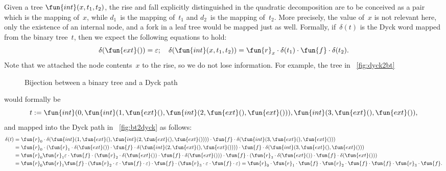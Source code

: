 Given a tree \(\fun{int}(x,t_1,t_2)\), the rise and fall explicitly
distinguished in the quadratic decomposition are to be conceived as a
pair which is the mapping of~\(x\), while \(d_1\)~is the mapping
of~\(t_1\) and \(d_2\)~is the mapping of~\(t_2\). More precisely, the
value of~\(x\) is not relevant here, only the existence of an internal
node, and a fork in a leaf tree would be mapped just as well. Formally,
if~\(\delta(t)\) is the Dyck word mapped from the binary tree~\(t\),
then we expect the following equations to hold:
\begin{equation}
\delta(\fun{ext}()) = \varepsilon; \quad \delta(\fun{int}(x,t_1,t_2))
= \fun{r}_{x} \cdot \delta(t_1) \cdot \fun{f} \cdot \delta(t_2).
\label{eq:delta}
\end{equation}
Note that we attached the node contents~\(x\) to the rise, so we do
not lose information. For example, the tree in \fig~\vref{fig:dyck2bt}
\begin{figure}
\centering
{}
\qquad\quad
\subfloat[Dyck path corresponding to preorder encoding $[0,1,\Box,2,\Box,\Box,3,\Box,\Box\char93$\label{fig:bt2dyck}]{%
\texttt{[image: bt2dyck]}}
\caption{Bijection between a binary tree and a Dyck path}
\end{figure}
would formally be
\begin{equation*}
  t := \fun{int}(0, \fun{int}(1, \fun{ext}(),
\fun{int}(2, \fun{ext}(), \fun{ext}())), \fun{int}(3, \fun{ext}(),
\fun{ext}()),
\end{equation*}
and mapped into the Dyck path in
\fig~\ref{fig:bt2dyck} as
follows:
\begin{align*}
\delta(t)
&= \fun{r}_0 \cdot \delta(\fun{int}(1, \fun{ext}(),
\fun{int}(2, \fun{ext}(), \fun{ext}()))) \cdot \fun{f} \cdot
\delta(\fun{int}(3, \fun{ext}(), \fun{ext}()))\\ &= \fun{r}_0
\cdot (\fun{r}_1 \cdot \delta(\fun{ext}()) \cdot \fun{f} \cdot
\delta(\fun{int}(2, \fun{ext}(), \fun{ext}()))) \cdot
\fun{f} \cdot \delta(\fun{int}(3, \fun{ext}(), \fun{ext}()))\\
&= \fun{r}_0 \fun{r}_1 \varepsilon \cdot \fun{f} \cdot (\fun{r}_2
\cdot \delta(\fun{ext}()) \cdot \fun{f} \cdot \delta(\fun{ext}()))
\cdot \fun{f} \cdot (\fun{r}_3 \cdot \delta(\fun{ext}()) \cdot \fun{f}
\cdot \delta(\fun{ext}()))\\
&= \fun{r}_0 \fun{r}_1 \fun{f} \cdot (\fun{r}_2 \cdot
\varepsilon \cdot \fun{f} \cdot \varepsilon) \cdot
\fun{f} \cdot (\fun{r}_3 \cdot \varepsilon \cdot \fun{f} \cdot
\varepsilon)
= \fun{r}_0 \cdot \fun{r}_1 \cdot \fun{f} \cdot \fun{r}_2 \cdot \fun{f} \cdot \fun{f} \cdot \fun{r}_3 \cdot \fun{f}.
\end{align*}
